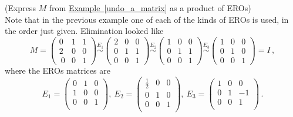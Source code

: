 \begin{example} (Express $M$ from  
\hyperlink{undo a matrix}{Example~\ref*{undo_a_matrix}} as a product of EROs)\\
Note that in the previous example 
one of each of the kinds of EROs is used, in the order just given.
Elimination looked like 
\[
M=
\left(\begin{array}{ccc}
0 & 1 & 1 \\ 
2 & 0 & 0 \\\
0& 0 & 1  
\end{array}  \right)
\stackrel{E_1}{\sim}
\left(\begin{array}{ccc}
2 & 0 & 0 \\
0 & 1 & 1 \\ 
0& 0 & 1  
\end{array}  \right)
\stackrel{E_2}{\sim}
\left(\begin{array}{ccc}
1 & 0 & 0 \\
0 & 1 & 1 \\ 
0& 0 & 1  
\end{array}  \right)
\stackrel{E_3}{\sim}
\left(\begin{array}{ccc}
1 & 0 & 0 \\
0 & 1 & 0 \\ 
0& 0 & 1  
\end{array}  \right)
=I\, ,
\]
where the EROs matrices are 
\[
E_1
= \left(\begin{array}{ccc}
0  &1 &0\\
1  &0 &0\\ 
0  &0 &1\\
\end{array}  \right)
,~
E_2
= \left(\begin{array}{ccc}
\frac12  &0 &0\\
0  &1 &0\\ 
0  &0 &1\\
\end{array}  \right) , ~
E_3
= \left(\begin{array}{ccc}
1  &0 &0\\
0  &1 & -1\\ 
0  &0 &1\\
\end{array}  \right) \,.
\]

\end{example}
